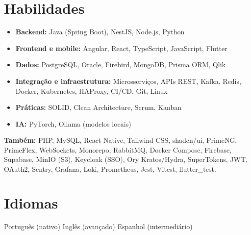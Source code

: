 \section{Habilidades}
\begin{itemize}
	\item \textbf{Backend:} Java (Spring Boot), NestJS, Node.js, Python
	\item \textbf{Frontend e mobile:} Angular, React, TypeScript, JavaScript, Flutter
	\item \textbf{Dados:} PostgreSQL, Oracle, Firebird, MongoDB, Prisma ORM, Qlik
	\item \textbf{Integração e infraestrutura:} Microsserviços, APIs REST, Kafka, Redis, Docker, Kubernetes, HAProxy, CI/CD, Git, Linux
	\item \textbf{Práticas:} SOLID, Clean Architecture, Scrum, Kanban
	\item \textbf{IA:} PyTorch, Ollama (modelos locais)
\end{itemize}
{\small \textbf{Também:} PHP, MySQL, React Native, Tailwind CSS, shadcn/ui, PrimeNG, PrimeFlex, WebSockets, Monorepo, RabbitMQ, Docker Compose, Firebase, Supabase, MinIO (S3), Keycloak (SSO), Ory Kratos/Hydra, SuperTokens, JWT, OAuth2, Sentry, Grafana, Loki, Prometheus, Jest, Vitest, flutter\_test.}

\section{Idiomas}
Português (nativo) {\textbullet} Inglês (avançado) {\textbullet} Espanhol (intermediário)
